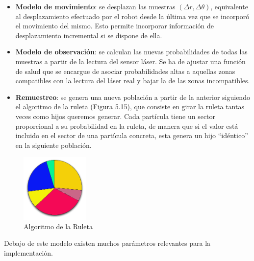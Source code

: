 \begin{itemize}
	\item \textbf{ Modelo de movimiento}: se desplazan las muestras $(\Delta r, \Delta\theta)$, equivalente al desplazamiento efectuado por el robot desde la última vez que se incorporó el movimiento del mismo. Esto permite incorporar información de desplazamiento incremental si se dispone de ella. 
	\item \textbf{Modelo de observación}: se calculan las nuevas probabilidades de todas las muestras a partir de la lectura del sensor láser. Se ha de ajustar una función de salud que se encargue de asociar probabilidades altas a aquellas zonas compatibles con la lectura del láser real y bajar la de las zonas incompatibles. 
	\item \textbf{Remuestreo}: se genera una nueva población a partir de la anterior siguiendo el algoritmo de la ruleta (Figura 5.15), que consiste en girar la ruleta tantas veces como hijos queremos generar. Cada partícula tiene un sector proporcional a su probabilidad en la ruleta, de manera que si el valor está incluido en el sector de una partícula concreta, esta genera un hijo “idéntico” en la siguiente población.
\end{itemize}

\begin{figure}[H]
	\begin{center}
		\includegraphics[width=0.3\textwidth]{figures/ruleta.png}
		\caption{Algoritmo de la Ruleta}
		\label{fig.ruleta}
		\end{center}
\end{figure}

Debajo de este modelo existen muchos parámetros relevantes para la implementación.

